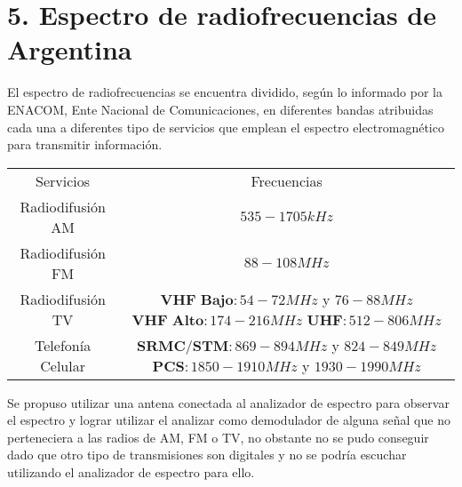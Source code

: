 \section{5. Espectro de radiofrecuencias de Argentina}
El espectro de radiofrecuencias se encuentra dividido, seg\'un lo informado por la ENACOM, Ente Nacional de Comunicaciones,
en diferentes bandas atribuidas cada una a diferentes tipo de servicios que emplean el espectro electromagn\'etico para transmitir informaci\'on.

\begin{table}[H]
    \centering
    \begin{tabular}{c c}
        Servicios & Frecuencias \\
        Radiodifusi\'on AM & $535 - 1705 kHz$ \\
        Radiodifusi\'on FM & $88 - 108 MHz$ \\
        Radiodifusi\'on TV & $\textbf{VHF Bajo}: 54 - 72 MHz$ y $76 - 88 MHz$  $\textbf{VHF Alto}: 174 - 216 MHz$ $\textbf{UHF}: 512 - 806 MHz$ \\
        Telefon\'ia Celular & $\textbf{SRMC/STM}: 869 - 894 MHz$ y $824 - 849 MHz$ $\textbf{PCS}: 1850 - 1910 MHz$ y $1930 - 1990 MHz$ \\
    \end{tabular}
\end{table}

Se propuso utilizar una antena conectada al analizador de espectro para observar el espectro y lograr utilizar el analizar como demodulador de alguna se\~nal que no perteneciera
a las radios de AM, FM o TV, no obstante no se pudo conseguir dado que otro tipo de transmisiones son digitales y no se podr\'ia escuchar utilizando
el analizador de espectro para ello.
